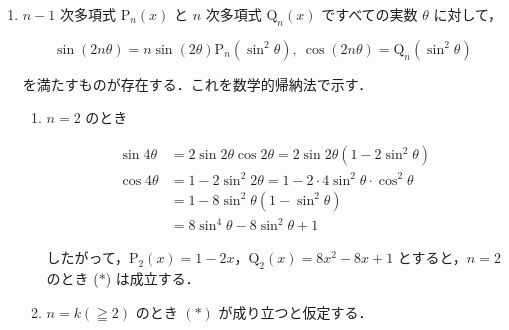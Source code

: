 \documentclass[a4paper]{ltjsarticle}
\begin{document}
\begin{enumerate}[label=(\arabic*)]
    \item $n-1$ 次多項式 $\mathrm{P}_n(x)$ と $n$ 次多項式 $\mathrm{Q}_n(x)$ ですべての実数 $\theta$ に対して，

          \begin{equation*}
              \sin(2n\theta)=n\sin(2\theta)\mathrm{P}_n(\sin^2\theta),\ \cos(2n\theta)=\mathrm{Q}_n(\sin^2\theta)\tag{\ast}
          \end{equation*}

          を満たすものが存在する．これを数学的帰納法で示す．
          \begin{enumerate}[label=(\Roman*)]
              \item $n=2$ のとき

                    \begin{align*}
                        \sin 4\theta & =2\sin{2\theta}\cos{2\theta}=2\sin2\theta(1-2\sin^2\theta)  \\
                        \cos 4\theta & =1-2\sin^{2}2\theta=1-2\cdot 4\sin^2\theta\cdot\cos^2\theta \\
                                     & =1-8\sin^2\theta(1-\sin^2\theta)                            \\
                                     & =8\sin^4\theta-8\sin^2\theta+1
                    \end{align*}

                    したがって，$\mathrm{P}_2(x)=1-2x$，$\mathrm{Q}_2(x)=8x^2-8x+1$ とすると，$n=2$ のとき ($\ast$) は成立する．

              \item $n=k(\geqq2)$ のとき $(\ast)$ が成り立つと仮定する．


\end{enumerate}
\end{enumerate}
\end{document}
